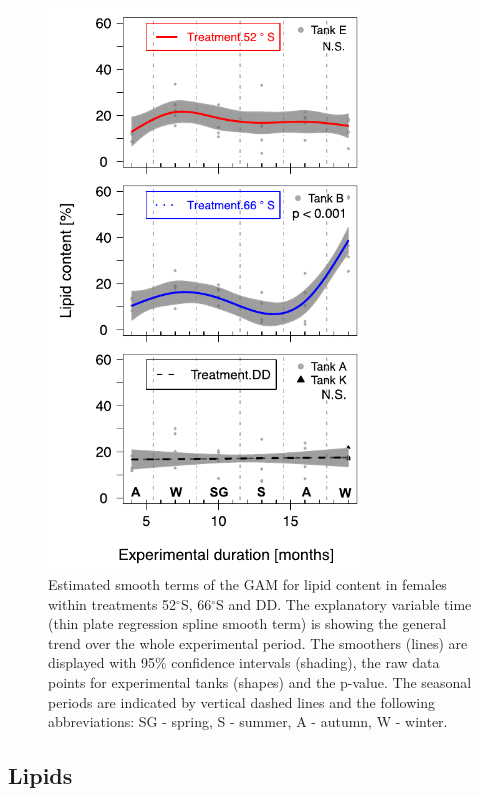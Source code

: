 \begin{figure}
        \centering
        \includegraphics[width=0.75\textwidth]{../Figures/Pub2_5.pdf}
        \caption{Estimated smooth terms of the GAM for lipid content in females
        within treatments 52$^{\circ}$S, 66$^{\circ}$S and DD. The explanatory
        variable time (thin plate regression spline smooth term) is showing the
        general trend over the whole experimental period. The smoothers (lines)
        are displayed with 95\% confidence intervals (shading), the raw data
        points for experimental tanks (shapes) and the p-value. The seasonal
        periods are indicated by vertical dashed lines and the following
        abbreviations: SG - spring, S - summer, A - autumn, W - winter.}
        \label{Pub2_5}
\end{figure}

\subsection{Lipids}

